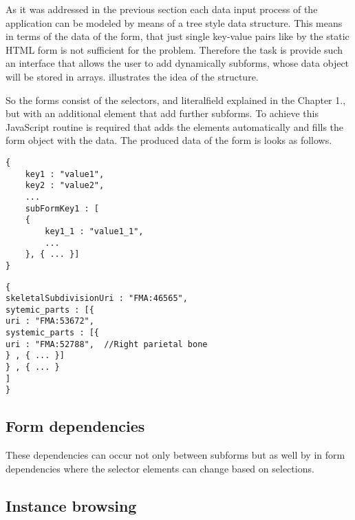 As it was addressed in the previous section each data input process of the application can be modeled by means of a tree style data structure. This means in terms of the data of the form, that just single key-value pairs like by the static HTML form is not sufficient for the problem. Therefore the task is provide such an interface that allows the user to add dynamically subforms, whose data object will be stored in arrays.  illustrates the idea of the structure. 


So the forms consist of the selectors, and literalfield explained in the Chapter 1., but with an additional element that add further subforms. To achieve this JavaScript routine is required that adds the elements automatically and fills the form object with the data. The produced data of the form is looks as follows.


\begin{lstlisting}[captionpos=b, caption=JSON object of the form, label=3rd:sparql,
basicstyle=\footnotesize,frame=single]
{
	key1 : "value1",
	key2 : "value2",
	...
	subFormKey1 : [
	{
		key1_1 : "value1_1",
		...				
	}, { ... }]
}
\end{lstlisting}





\begin{lstlisting}[captionpos=b, caption= data representing skull, label=skullJSON,
basicstyle=\footnotesize,frame=single]
{
skeletalSubdivisionUri : "FMA:46565",
sytemic_parts : [{
uri : "FMA:53672",
systemic_parts : [{
uri : "FMA:52788",  //Right parietal bone
} , { ... }]
} , { ... }
]	
}
\end{lstlisting}



\subsection{Form dependencies} \label{formDependencies}



These dependencies can occur not only between subforms but as well by in form dependencies where the selector elements can change based on selections.

\subsection{Instance browsing}


